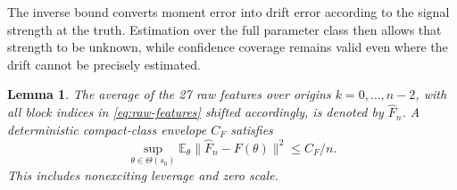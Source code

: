 \documentclass[11pt,a4paper]{amsart}
\theoremstyle{plain}
\newtheorem{lemma}[theorem]{Lemma}
\theoremstyle{definition}
\theoremstyle{remark}
\newcommand{\EE}{\mathbb{E}}
\begin{document}
The inverse bound converts moment error into drift error according to the
signal strength at the truth. Estimation over the full parameter class
then allows that strength to be unknown, while confidence coverage remains
valid even where the drift cannot be precisely estimated.

\begin{lemma}\label{lem:moment-variance}
The average of the 27 raw features over origins $k=0,\ldots,n-2$, with all
block indices in \eqref{eq:raw-features} shifted accordingly, is denoted by
$\widehat F_n$. A deterministic compact-class envelope $C_F$ satisfies
\begin{equation}\label{eq:moment-variance}
 \sup_{\theta\in\Theta(s_0)}
 \EE_\theta\|\widehat F_n-F(\theta)\|^2\le C_F/n.
\end{equation}
This includes nonexciting leverage and zero scale.
\end{lemma}
\end{document}
